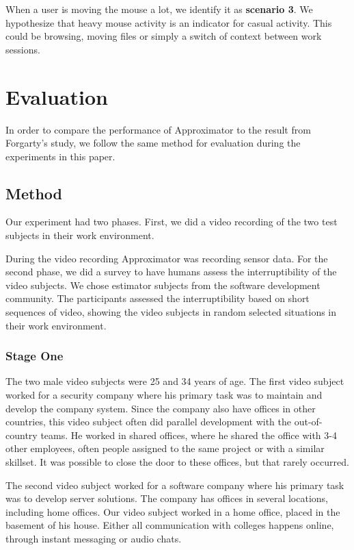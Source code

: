 \documentclass{sigchi}
\begin{document}
When a user is moving the mouse a lot, we identify it as \textbf{scenario 3}.
We hypothesize that heavy mouse activity is an indicator for casual activity.
This could be browsing, moving files or simply a switch of context between work sessions.

\section{Evaluation}
In order to compare the performance of Approximator to the result from Forgarty's study, we follow the same method for evaluation during the experiments in this paper.

\subsection{Method}
\label{method}
Our experiment had two phases.
First, we did a video recording of the two test subjects in their work environment.

During the video recording Approximator was recording sensor data.
For the second phase, we did a survey to have humans assess the interruptibility of the video subjects.
We chose estimator subjects from the software development community.
The participants assessed the interruptibility based on short sequences of video, showing the video subjects in random selected situations in their work environment.

\subsubsection{Stage One}
The two male video subjects were 25 and 34 years of age.
The first video subject worked for a security company where his primary task was to maintain and develop the company system.
Since the company also have offices in other countries, this video subject often did parallel development with the out-of-country teams.
He worked in shared offices, where he shared the office with 3-4 other employees, often people assigned to the same project or with a similar skillset.
It was possible to close the door to these offices, but that rarely occurred.

The second video subject worked for a software company where his primary task was to develop server solutions.
The company has offices in several locations, including home offices.
Our video subject worked in a home office, placed in the basement of his house.
Either all communication with colleges happens online, through instant messaging or audio chats.
\end{document}
